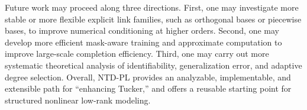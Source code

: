 Future work may proceed along three directions. First, one may investigate more stable or more flexible explicit link families, such as orthogonal bases or piecewise bases, to improve numerical conditioning at higher orders. Second, one may develop more efficient mask-aware training and approximate computation to improve large-scale completion efficiency. Third, one may carry out more systematic theoretical analysis of identifiability, generalization error, and adaptive degree selection. Overall, NTD-PL provides an analyzable, implementable, and extensible path for ``enhancing Tucker,'' and offers a reusable starting point for structured nonlinear low-rank modeling.
